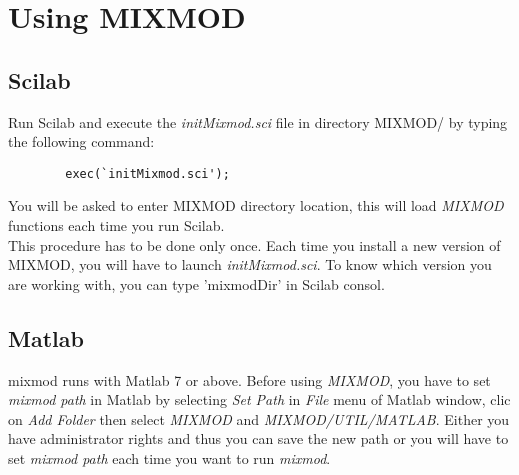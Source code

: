 
\section{Using {\sc MIXMOD}}
\subsection*{Scilab}
Run Scilab and execute the {\em initMixmod.sci} file in directory MIXMOD/ by typing the following command:
\begin{verbatim}
        exec(`initMixmod.sci');
\end{verbatim}
You will be asked to enter MIXMOD directory location, this will load {\em MIXMOD} functions each time you run Scilab.\\
This procedure has to be done only once.
Each time you install a new version of MIXMOD, you will have to launch {\em initMixmod.sci}. To know which
version you are working with, you can type 'mixmodDir' in Scilab consol.




\subsection*{Matlab}

{\sc mixmod} runs with Matlab 7 or above.
Before using {\em MIXMOD}, you have to set {\em mixmod path} in Matlab
by selecting \textit{Set Path} in \textit{File} menu of Matlab window, clic on \textit{Add Folder} then
select {\em MIXMOD} and {\em MIXMOD/UTIL/MATLAB}.
Either you have administrator
rights and thus you can save the new path or you will have to set {\em mixmod path} each time you
want to run {\em mixmod}.






